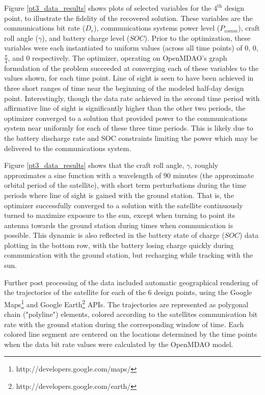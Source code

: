 \documentclass[]{aiaa-tc} %
\begin{document}
        Figure \ref{pt3_data_results} shows plots of selected variables for the $4^{\textrm{th}}$ design point,
        to illustrate the fidelity of the recovered solution. These variables are the communications
        bit rate ($D_r$), communications systems power level ($P_{comm}$), craft roll angle ($\gamma$),
        and battery charge level ($SOC$). Prior to the optimization, these variables
        were each instantiated to uniform values
        (across all time points) of 0, 0, $\frac{\pi}{4}$, and 0 respectively. The optimizer, operating on
        OpenMDAO's graph formulation of the problem succeeded at converging each of these variables to the values
        shown, for each time point. Line of sight is seen to have been achieved in three short ranges of time near the
        beginning of the modeled half-day design point. Interestingly, though the data rate achieved in the second
        time period with affirmative line of sight is significantly higher than the other two periods, the optimizer
        converged to a solution that provided power to the communications system near uniformly for each of these
        three time periods. This is likely due to the battery discharge rate and SOC constraints limiting
        the power which may be delivered to the communications system.

        Figure \ref{pt3_data_results} shows that the craft roll angle, $\gamma$, roughly approximates a sine function
        with a wavelength of 90 minutes (the approximate orbital period of the satellite),
        with short term perturbations during the time
        periods where line of sight is gained with the ground station. That is, the optimizer successfully
        converged to a solution with the satellite continuously turned to maximize exposure to the sun,
        except when turning to point its antenna towards the ground station during times when
        communication is possible. This dynamic is also reflected in the battery state of charge ($SOC$)
        data plotting in the bottom row, with the battery losing charge quickly during
        communication with the ground station, but recharging while tracking with the sun.

        Further post processing of the data included automatic geographical rendering of the trajectories of
        the  satellite for each of the 6 design points, using the Google
        Maps\footnote{http://developers.google.com/maps/} and Google
        Earth\footnote{http://developers.google.com/earth/} APIs. The trajectories are
        represented as polygonal chain ("polyline") elements, colored according to the
        satellites communication bit rate with the ground station during the corresponding
        window of time. Each colored line segment are centered on the locations
        determined by the time points when the data bit rate values were calculated
        by the OpenMDAO model.
\end{document}
